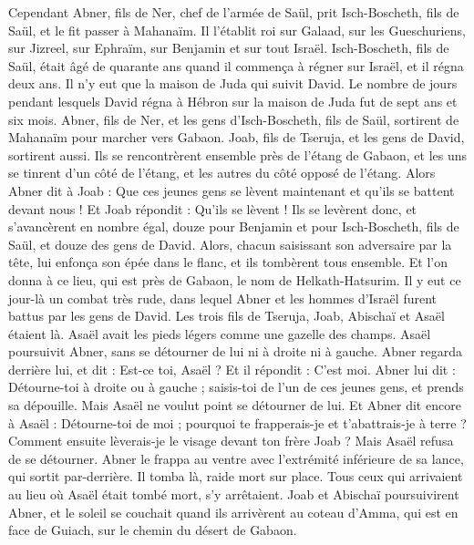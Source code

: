 \begin{multicols}{2}
Cependant Abner, fils de Ner, chef de l'armée de Saül, prit Isch-Boscheth, fils de Saül, et le fit passer à Mahanaïm.
Il l'établit roi sur Galaad, sur les Gueschuriens, sur Jizreel, sur Ephraïm, sur Benjamin et sur tout Israël.
Isch-Boscheth, fils de Saül, était âgé de quarante ans quand il commença à régner sur Israël, et il régna deux ans. Il n'y eut que la maison de Juda qui suivit David.
Le nombre de jours pendant lesquels David régna à Hébron sur la maison de Juda fut de sept ans et six mois.
Abner, fils de Ner, et les gens d'Isch-Boscheth, fils de Saül, sortirent de Mahanaïm pour marcher vers Gabaon.
Joab, fils de Tseruja, et les gens de David, sortirent aussi. Ils se rencontrèrent ensemble près de l'étang de Gabaon, et les uns se tinrent d'un côté de l'étang, et les autres du côté opposé de l'étang.
Alors Abner dit à Joab : Que ces jeunes gens se lèvent maintenant et qu'ils se battent devant nous ! Et Joab répondit : Qu'ils se lèvent !
Ils se levèrent donc, et s'avancèrent en nombre égal, douze pour Benjamin et pour Isch-Boscheth, fils de Saül, et douze des gens de David.
Alors, chacun saisissant son adversaire par la tête, lui enfonça son épée dans le flanc, et ils tombèrent tous ensemble. Et l'on donna à ce lieu, qui est près de Gabaon, le nom de Helkath-Hatsurim.
Il y eut ce jour-là un combat très rude, dans lequel Abner et les hommes d'Israël furent battus par les gens de David.
Les trois fils de Tseruja, Joab, Abischaï et Asaël étaient là. Asaël avait les pieds légers comme une gazelle des champs.
Asaël poursuivit Abner, sans se détourner de lui ni à droite ni à gauche.
Abner regarda derrière lui, et dit : Est-ce toi, Asaël ? Et il répondit : C'est moi.
Abner lui dit : Détourne-toi à droite ou à gauche ; saisis-toi de l'un de ces jeunes gens, et prends sa dépouille. Mais Asaël ne voulut point se détourner de lui.
Et Abner dit encore à Asaël : Détourne-toi de moi ; pourquoi te frapperais-je et t'abattrais-je à terre ? Comment ensuite lèverais-je le visage devant ton frère Joab ?
Mais Asaël refusa de se détourner. Abner le frappa au ventre avec l'extrémité inférieure de sa lance, qui sortit par-derrière. Il tomba là, raide mort sur place. Tous ceux qui arrivaient au lieu où Asaël était tombé mort, s'y arrêtaient.
Joab et Abischaï poursuivirent Abner, et le soleil se couchait quand ils arrivèrent au coteau d'Amma, qui est en face de Guiach, sur le chemin du désert de Gabaon.

\end{multicols}
